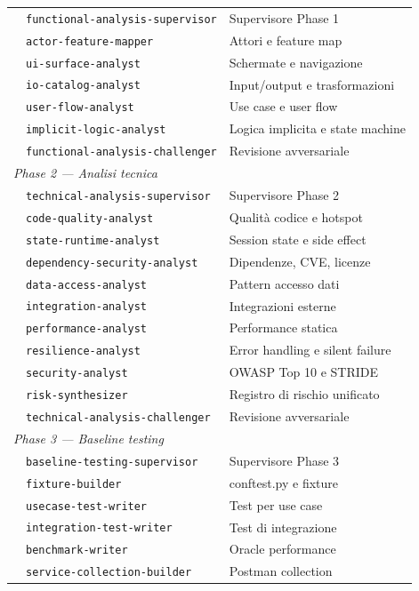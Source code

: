 \documentclass[12pt,a4paper,twoside]{book}
\begin{document}
\begin{longtable}{llp{7cm}}
 & \texttt{functional-analysis-supervisor} & Supervisore Phase 1 \\
 & \texttt{actor-feature-mapper} & Attori e feature map \\
 & \texttt{ui-surface-analyst} & Schermate e navigazione \\
 & \texttt{io-catalog-analyst} & Input/output e trasformazioni \\
 & \texttt{user-flow-analyst} & Use case e user flow \\
 & \texttt{implicit-logic-analyst} & Logica implicita e state machine \\
 & \texttt{functional-analysis-challenger} & Revisione avversariale \\
\midrule
\multicolumn{3}{l}{\textit{Phase 2 — Analisi tecnica}} \\
 & \texttt{technical-analysis-supervisor} & Supervisore Phase 2 \\
 & \texttt{code-quality-analyst} & Qualità codice e hotspot \\
 & \texttt{state-runtime-analyst} & Session state e side effect \\
 & \texttt{dependency-security-analyst} & Dipendenze, CVE, licenze \\
 & \texttt{data-access-analyst} & Pattern accesso dati \\
 & \texttt{integration-analyst} & Integrazioni esterne \\
 & \texttt{performance-analyst} & Performance statica \\
 & \texttt{resilience-analyst} & Error handling e silent failure \\
 & \texttt{security-analyst} & OWASP Top 10 e STRIDE \\
 & \texttt{risk-synthesizer} & Registro di rischio unificato \\
 & \texttt{technical-analysis-challenger} & Revisione avversariale \\
\midrule
\multicolumn{3}{l}{\textit{Phase 3 — Baseline testing}} \\
 & \texttt{baseline-testing-supervisor} & Supervisore Phase 3 \\
 & \texttt{fixture-builder} & conftest.py e fixture \\
 & \texttt{usecase-test-writer} & Test per use case \\
 & \texttt{integration-test-writer} & Test di integrazione \\
 & \texttt{benchmark-writer} & Oracle performance \\
 & \texttt{service-collection-builder} & Postman collection \\

\end{longtable}
\end{document}

